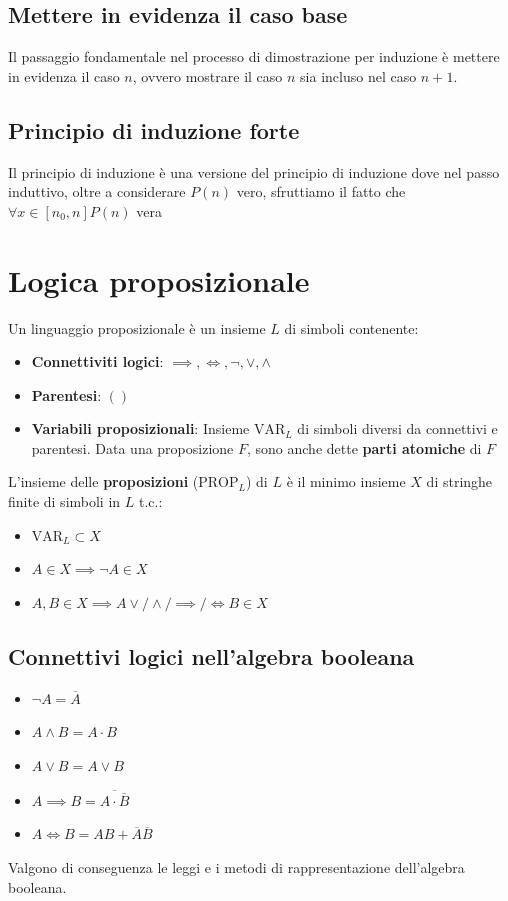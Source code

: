 \documentclass{report}
\begin{document}
    \subsection{Mettere in evidenza il caso base}
        Il passaggio fondamentale nel processo di dimostrazione per induzione 
        è mettere in evidenza il caso $n$, ovvero mostrare il caso $n$ sia incluso nel caso 
        $n+1$. 
    \subsection{Principio di induzione forte}
        Il principio di induzione è una versione del principio di induzione dove 
        nel passo induttivo, oltre a considerare $P\left(n\right)$ vero, sfruttiamo il 
        fatto che $\forall x \in \left[n_0, n\right] P\left(n\right)$ vera 
\section{Logica proposizionale}
    Un linguaggio proposizionale è un insieme $L$ di simboli contenente:
    \begin{itemize}
        \item \textbf{Connettiviti logici}: $\implies, \iff, \neg, \lor, \land$
        \item \textbf{Parentesi}: $\left(\right)$
        \item \textbf{Variabili proposizionali}: Insieme $\textrm{VAR}_L$ di simboli diversi da connettivi e parentesi. 
            Data una proposizione $F$, sono anche dette \textbf{parti atomiche} di $F$
    \end{itemize}
    L'insieme delle \textbf{proposizioni} ($\textrm{PROP}_L$) di $L$ è il minimo insieme $X$ di stringhe
    finite di simboli in $L$ t.c.:
    \begin{itemize}
        \item $\textrm{VAR}_L \subset X$
        \item $A \in X \implies \neg A \in X$
        \item $A, B \in X \implies A \lor/\land/\implies/\iff B \in X$
    \end{itemize}
    \subsection{Connettivi logici nell'algebra booleana}
        \begin{itemize}
            \item $\neg A = \overline{A}$
            \item $A \land B = A \cdot B$
            \item $A \lor B = A \lor B$
            \item $A \implies B = \overline{A \cdot \overline{B}}$
            \item $A \iff B = AB + \overline{A}\overline{B}$
        \end{itemize}
        Valgono di conseguenza le leggi e i metodi di rappresentazione dell'algebra booleana.
\end{document}
